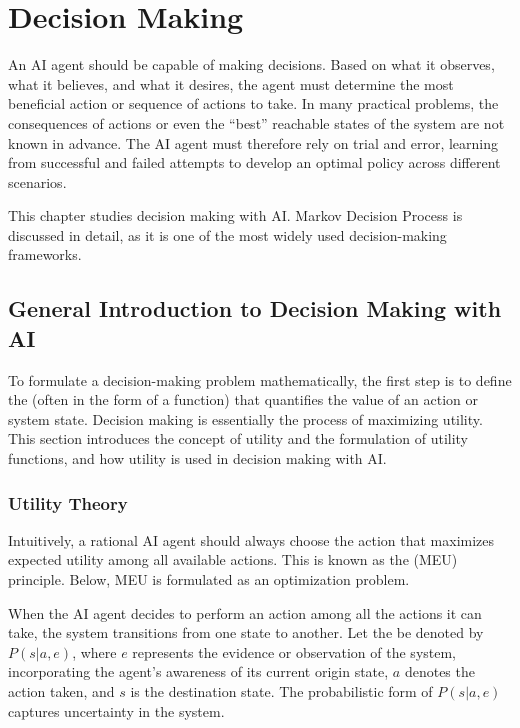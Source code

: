 \chapter{Decision Making}

An AI agent should be capable of making decisions. Based on what it observes, what it believes, and what it desires, the agent must determine the most beneficial action or sequence of actions to take. In many practical problems, the consequences of actions or even the “best” reachable states of the system are not known in advance. The AI agent must therefore rely on trial and error, learning from successful and failed attempts to develop an optimal policy across different scenarios.

This chapter studies decision making with AI. Markov Decision Process is discussed in detail, as it is one of the most widely used decision-making frameworks.

\section{General Introduction to Decision Making with AI}

To formulate a decision-making problem mathematically, the first step is to define the  (often in the form of a function) that quantifies the value of an action or system state. Decision making is essentially the process of maximizing utility. This section introduces the concept of utility and the formulation of utility functions, and how utility is used in decision making with AI.

\subsection{Utility Theory}

Intuitively, a rational AI agent should always choose the action that maximizes expected utility among all available actions. This is known as the  (MEU) principle. Below, MEU is formulated as an optimization problem.

When the AI agent decides to perform an action among all the actions it can take, the system transitions from one state to another. Let the  be denoted by $P(s|a,e)$, where $e$ represents the evidence or observation of the system, incorporating the agent’s awareness of its current origin state, $a$ denotes the action taken, and $s$ is the destination state. The probabilistic form of $P(s|a,e)$ captures uncertainty in the system.

